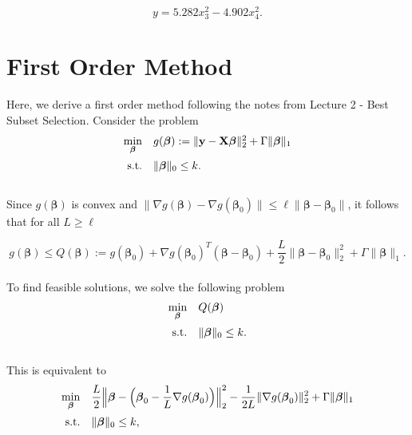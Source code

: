 \documentclass[12pt]{article}
\newcommand{\M}{\mathbf}
\newcommand{\MS}{\boldsymbol}
\newcommand{\1}{\mathds{1}}
\begin{document}
\begin{equation}
y = 5.282 x_3^2 - 4.902 x_4^2.
\end{equation}

\section{First Order Method}

Here, we derive a first order method following the notes from Lecture 2 - Best Subset Selection.  Consider the problem
\begin{equation}
\begin{array}{rll}
  \min \limits_{\MS \beta} & g(\MS \beta) := \|\M y - \M X \MS \beta \|_2^2 + \Gamma \| \MS \beta \|_1 \vspace{5pt}\\
  \text{s.t.} & \| \MS \beta \|_0 \le k.
\end{array}
\end{equation}\\

Since $g(\MS \beta)$ is convex and $\|\nabla g(\MS \beta) - \nabla g(\MS \beta_0)\| \le \ell \| \MS \beta - \MS \beta_0\|$, it follows that for all $L \ge \ell$

\begin{equation}
g(\MS \beta) \le Q(\MS \beta) := g(\MS \beta_0) + \nabla g(\MS \beta_0)^T(\MS \beta - \MS \beta_0) + \frac{L}{2} \|\MS \beta - \MS \beta_0\|_2^2 + \Gamma \| \MS \beta \|_1.
\end{equation}\\

To find feasible solutions, we solve the following problem
\begin{equation}
\begin{array}{rll}
  \min \limits_{\MS \beta} & Q(\MS \beta) \vspace{5pt}\\
  \text{s.t.} & \| \MS \beta \|_0 \le k.
\end{array}
\end{equation}\\

This is equivalent to
\begin{equation}
\begin{array}{rll}
  \min \limits_{\MS \beta} & \displaystyle \frac{L}{2}\Big\|\MS \beta - \Big(\MS \beta_0 - \frac{1}{L} \nabla g(\MS \beta_0)\Big) \Big\|_2^2 - \frac{1}{2L} \|\nabla g(\MS \beta_0) \|_2^2 + \Gamma \| \MS \beta \|_1 \vspace{5pt}\\
  \text{s.t.} & \| \MS \beta \|_0 \le k,
\end{array}
\end{equation}\\
\end{document}
